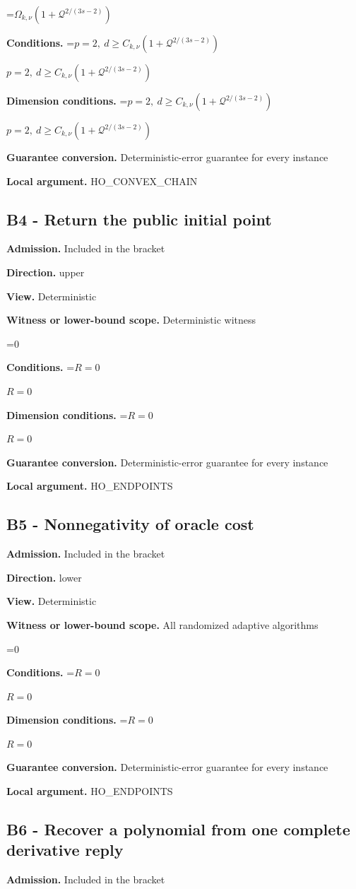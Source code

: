 \documentclass[10pt,a4paper]{article}
\newcommand{\AtlasMath}[1]{\par\begingroup\centering\setbox0=\hbox{$\displaystyle #1$}\ifdim\wd0>1.4\linewidth\typeout{ATLAS WIDE FORMULA: \the\wd0}\fi\ifdim\wd0>\linewidth\resizebox{\linewidth}{!}{\box0}\else\box0\fi\par\endgroup}
\newcommand{\AtlasInlineMath}[1]{\begingroup\setbox0=\hbox{$#1$}\ifdim\wd0>.4\linewidth\endgroup\AtlasMath{#1}\else\endgroup$#1$\fi}
\begin{document}
\AtlasMath{\Omega_{k,\nu}(1+\mathcal{Q}^{2/(3s-2)})}
\textbf{Conditions.} \AtlasInlineMath{p=2,\ d\ge C_{k,\nu}(1+\mathcal{Q}^{2/(3s-2)})}

\textbf{Dimension conditions.} \AtlasInlineMath{p=2,\ d\ge C_{k,\nu}(1+\mathcal{Q}^{2/(3s-2)})}

\textbf{Guarantee conversion.} Deterministic-error guarantee for every instance

\textbf{Local argument.} HO\_\allowbreak{}CONVEX\_\allowbreak{}CHAIN

\subsection{B4 - Return the public initial point}
\textbf{Admission.} Included in the bracket

\textbf{Direction.} upper

\textbf{View.} Deterministic

\textbf{Witness or lower-bound scope.} Deterministic witness

\AtlasMath{0}
\textbf{Conditions.} \AtlasInlineMath{R=0}

\textbf{Dimension conditions.} \AtlasInlineMath{R=0}

\textbf{Guarantee conversion.} Deterministic-error guarantee for every instance

\textbf{Local argument.} HO\_\allowbreak{}ENDPOINTS

\subsection{B5 - Nonnegativity of oracle cost}
\textbf{Admission.} Included in the bracket

\textbf{Direction.} lower

\textbf{View.} Deterministic

\textbf{Witness or lower-bound scope.} All randomized adaptive algorithms

\AtlasMath{0}
\textbf{Conditions.} \AtlasInlineMath{R=0}

\textbf{Dimension conditions.} \AtlasInlineMath{R=0}

\textbf{Guarantee conversion.} Deterministic-error guarantee for every instance

\textbf{Local argument.} HO\_\allowbreak{}ENDPOINTS

\subsection{B6 - Recover a polynomial from one complete derivative reply}
\textbf{Admission.} Included in the bracket
\end{document}
